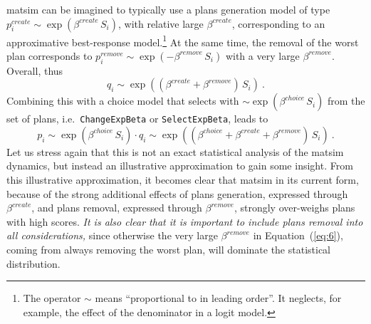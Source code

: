 \gls{matsim} can be imagined to typically use a plans generation model of type $p^{create}_i \sim \exp( \beta^{create}\, S_i )$, with relative large $\beta^{create}$, corresponding to an approximative best-response model.\footnote{%
%
The operator $\sim$ means ``proportional to in leading order''.  It neglects, for example, the effect of the denominator in a logit model.
%
}
%
At the same time, the removal of the worst plan corresponds to $p^{remove}_i \sim \exp( - \beta^{remove} \, S_i)$ with a very large $\beta^{remove}$.  Overall, thus
\[
q_i \sim \exp( (\beta^{create}+ \beta^{remove}) \, S_i ) \ .
\]
Combining this with a choice model that selects with $\sim \exp( \beta^{choice} \, S_i )$ from the set of plans, i.e.\ \lstinline{ChangeExpBeta} or \lstinline{SelectExpBeta}, leads to
\begin{equation}
p_i \sim \exp( \beta^{choice} \, S_i) \cdot q_i
%
\sim \exp( (\beta^{choice} + \beta^{create}+ \beta^{remove}) \, S_i ) \ .
\label{eq:6}
\end{equation}
Let us stress again that this is not an exact statistical analysis of the \gls{matsim} dynamics, but instead an illustrative approximation to gain some insight.
%
From this illustrative approximation, it becomes clear that \gls{matsim} in its current form, because of the strong additional effects of plans generation, expressed through $\beta^{create}$, and plans removal, expressed through $\beta^{remove}$, 
strongly over-weighs plans with high scores.  \emph{It 
  is also clear that it is important to include plans removal into all considerations,} since otherwise the very large $\beta^{remove}$ in Equation~(\ref{eq:6}), coming from always removing the worst plan, will dominate the statistical distribution.



